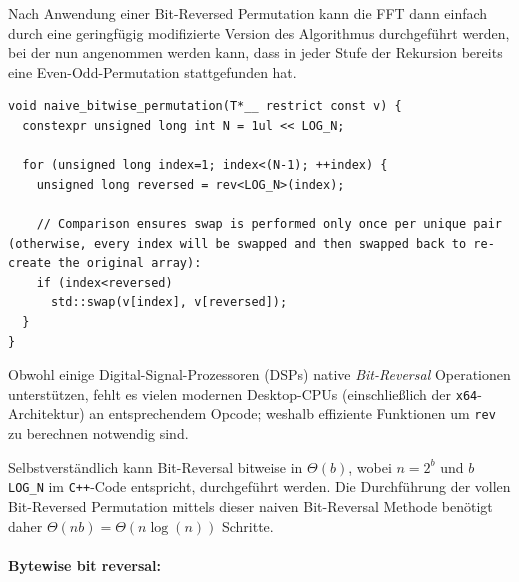 \documentclass[10pt]{article}
\begin{document}
Nach Anwendung einer Bit-Reversed Permutation kann die FFT dann einfach durch eine geringfügig 
modifizierte Version des Algorithmus durchgeführt werden, bei der nun angenommen werden kann, 
dass in jeder Stufe der Rekursion bereits eine Even-Odd-Permutation stattgefunden hat.

\begin{footnotesize}
\begin{lstlisting}[label={alg:simple-permutation},
caption={
%fixme
{\bf Durchführung einer Bit-Reversed Permutation mithilfe einer externen {\tt rev}-Funktion. } 
Sei {\tt LOG\_N} die Problemgröße spezifiziert als {\tt constexpr} (\emph{d.h.}, {\tt LOG\_N} ist zur Kompilierzeit 
als Konstante bekannt). Man Beachte, dass die Funktion {\tt rev} ein Template abhängig von der Problemgröße ist.}]
void naive_bitwise_permutation(T*__ restrict const v) {
  constexpr unsigned long int N = 1ul << LOG_N;

  for (unsigned long index=1; index<(N-1); ++index) {
    unsigned long reversed = rev<LOG_N>(index);

    // Comparison ensures swap is performed only once per unique pair (otherwise, every index will be swapped and then swapped back to re-create the original array):
    if (index<reversed)
      std::swap(v[index], v[reversed]);
  }
}
\end{lstlisting}
\end{footnotesize}

Obwohl einige Digital-Signal-Prozessoren (DSPs) native {\it Bit-Reversal} 
Operationen unterstützen, fehlt es vielen modernen Desktop-CPUs 
(einschließlich der {\tt x64}-Architektur) an entsprechendem Opcode; weshalb
effiziente Funktionen um {\tt rev} zu berechnen notwendig sind.

Selbstverständlich kann Bit-Reversal bitweise in $\Theta(b)$, wobei $n = 2^b$ und $b$ {\tt
  LOG\_N} im {\tt C++}-Code entspricht, durchgeführt werden. Die Durchführung der vollen Bit-Reversed
Permutation mittels dieser naiven Bit-Reversal Methode benötigt daher
$\Theta(n b) = \Theta(n \log(n))$ Schritte.

\paragraph{Bytewise bit reversal:}
\end{document}
